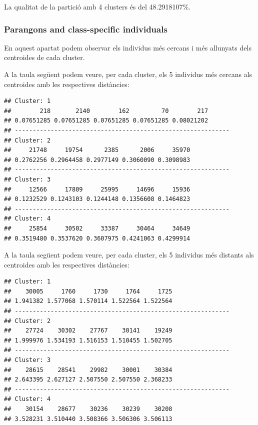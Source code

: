 \documentclass[
]{article}
\newenvironment{Shaded}{\begin{snugshade}}{\end{snugshade}}
\newcommand{\NormalTok}[1]{#1}
\newcommand{\SpecialCharTok}[1]{\textcolor[rgb]{0.00,0.00,0.00}{#1}}
\begin{document}
La qualitat de la partició amb 4 clusters és del 48.2918107\%.

\hypertarget{parangons-and-class-specific-individuals}{%
\subsubsection{Parangons and class-specific
individuals}\label{parangons-and-class-specific-individuals}}

En aquest apartat podem observar els individus més cercans i més
allunyats dels centroides de cada cluster.

A la taula següent podem veure, per cada cluster, els 5 individus més
cercans als centroides amb les respectives distàncies:

\begin{Shaded}
\end{Shaded}

\begin{verbatim}
## Cluster: 1
##        218       2140        162         70        217 
## 0.07651285 0.07651285 0.07651285 0.07651285 0.08021202 
## ------------------------------------------------------------ 
## Cluster: 2
##     21748     19754      2385      2006     35970 
## 0.2762256 0.2964458 0.2977149 0.3060090 0.3098983 
## ------------------------------------------------------------ 
## Cluster: 3
##     12566     17809     25995     14696     15936 
## 0.1232529 0.1243103 0.1244148 0.1356608 0.1464823 
## ------------------------------------------------------------ 
## Cluster: 4
##     25854     30502     33387     30464     34649 
## 0.3519480 0.3537620 0.3607975 0.4241063 0.4299914
\end{verbatim}

A la taula següent podem veure, per cada cluster, els 5 individus més
distants als centroides amb les respectives distàncies:

\begin{Shaded}
\end{Shaded}

\begin{verbatim}
## Cluster: 1
##    30005     1760     1730     1764     1725 
## 1.941382 1.577068 1.570114 1.522564 1.522564 
## ------------------------------------------------------------ 
## Cluster: 2
##    27724    30302    27767    30141    19249 
## 1.999976 1.534193 1.516153 1.510455 1.502705 
## ------------------------------------------------------------ 
## Cluster: 3
##    28615    28541    29982    30001    30384 
## 2.643395 2.627127 2.507550 2.507550 2.368233 
## ------------------------------------------------------------ 
## Cluster: 4
##    30154    28677    30236    30239    30208 
## 3.528231 3.510440 3.508366 3.506306 3.506113
\end{verbatim}
\end{document}
